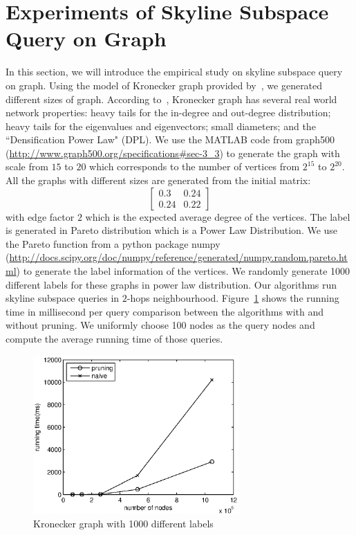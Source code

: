 \section{Experiments of Skyline Subspace Query on Graph}
\label{ch:exp:graph}
In this section, we will introduce the empirical study on skyline subspace query on graph.
Using the model of Kronecker graph provided by~\cite{leskovec2005realistic}, we generated different sizes of graph.
According to~\cite{leskovec2005realistic}, Kronecker graph has several real world network properties:
heavy tails for the in-degree and out-degree distribution;
heavy tails for the eigenvalues and eigenvectors;
small diameters; and the ``Densification Power Law" (DPL).
We use the MATLAB code from graph500 (\url{http://www.graph500.org/specifications#sec-3_3}) to generate the graph with scale from $15$ to $20$ which corresponds to the number of vertices from $2^{15}$ to $2^{20}$. All the graphs with different sizes are generated from the initial matrix:
\begin{equation}
\begin{bmatrix}
0.3 & 0.24\\ 
0.24 & 0.22
\end{bmatrix}
\end{equation}
with edge factor $2$ which is the expected average degree of the vertices. The label is generated in Pareto distribution which is a Power Law Distribution. We use the Pareto function from a python package numpy (\url{http://docs.scipy.org/doc/numpy/reference/generated/numpy.random.pareto.html}) to generate the label information of the vertices. We randomly generate 1000 different labels for these graphs in power law distribution. Our algorithms run skyline subspace queries in $2$-hops neighbourhood. Figure~\ref{fig:exp:kronecker} shows the running time in millisecond per query comparison between the algorithms with and without pruning. We uniformly choose 100 nodes as the query nodes and compute the average running time of those queries.

\begin{figure}[h]
    \centering
      \includegraphics[width=0.7\textwidth]{figs/kronecker}
    \caption{Kronecker graph with 1000 different labels}
    \label{fig:exp:kronecker}
\end{figure}

